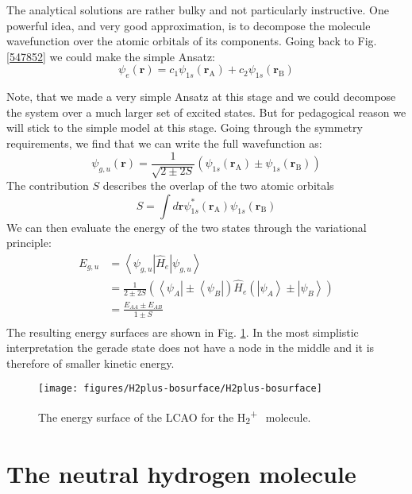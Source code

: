 \documentclass[10pt]{article}
\newcommand{\bra}[1]{\ensuremath{\left\langle#1\right|}}
\newcommand{\ket}[1]{\ensuremath{\left|#1\right\rangle}}
\newcommand{\vecra}{\mathbf{r}_\mathrm{A}}
\newcommand{\vecrb}{\mathbf{r}_\mathrm{B}}
\begin{document}
The analytical solutions are rather bulky and not particularly instructive. One powerful idea, and very good approximation, is to decompose the molecule wavefunction over the atomic orbitals of its components. Going back to Fig. \ref{547852} we could make the simple Ansatz:
\begin{equation}
\psi_e(\mathbf{r})= c_1 \psi_{1s}(\vecra)+c_2 \psi_{1s}(\vecrb)
\end{equation}

Note, that we made a very simple Ansatz at this stage and we could decompose the system over a much larger set of excited states. But for pedagogical reason we will stick to the simple model at this stage. Going through the symmetry requirements, we find that we can write the full wavefunction as:
\begin{equation}\label{Eq:LCAO_WF}
\psi_{g,u}(\mathbf{r})= \frac{1}{\sqrt{2\pm2S}}\left(\psi_{1s}(\vecra)\pm \psi_{1s}(\vecrb)\right)
\end{equation}
The contribution $S$ describes the overlap of the two atomic orbitals
\begin{equation}
S =  \int d\mathbf{r}\psi_{1s}^*(\vecra)\psi_{1s}(\vecrb)
\end{equation}
We can then evaluate the energy of the two states through the variational principle:
\begin{align}
E_{g,u} &= \bra{\psi_{g,u}}\hat{H}_e\ket{\psi_{g,u}}\\
 &= \frac{1}{2\pm2S}\left(\bra{\psi_A}\pm \bra{\psi_B}\right)\hat{H}_e\left(\ket{\psi_A}\pm \ket{\psi_B}\right)\\
 &= \frac{E_{AA}\pm E_{AB}}{1\pm S}\\
\end{align}
The resulting energy surfaces are shown in Fig. \ref{779212}. In the most simplistic interpretation the gerade state does not have a node in the middle and it is therefore of smaller kinetic energy.
\begin{figure}[h!]
\begin{center}
\texttt{[image: figures/H2plus-bosurface/H2plus-bosurface]}
\caption{{The energy surface of the LCAO for the
H\textsubscript{2}\textsuperscript{+~} molecule.
{\label{779212}}%
}}
\end{center}
\end{figure}

\section{ The neutral hydrogen molecule}
\end{document}
